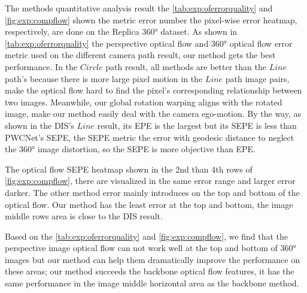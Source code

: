 The methods quantitative analysis result the \cref{tab:exp:oferrorquality} and \cref{fig:exp:compflow} shown the metric error number the pixel-wise error heatmap, respectively, are done on the Replica 360° dataset. 
As shown in \cref{tab:exp:oferrorquality} the perspective optical flow and 360° optical flow error metric used on the different camera path result, our method gets the best performance.
%
In the $Circle$ path result, all methods are better than the $Line$ path's because there is more large pixel motion in the $Line$ path image pairs, make the optical flow hard to find the pixel's corresponding relationship between two images. Meanwhile, our global rotation warping aligns with the rotated image, make our method easily deal with the camera ego-motion.
By the way, as shown in the DIS's $Line$ result, its EPE is the largest but its SEPE is less than PWCNet's SEPE, 
the SEPE metric the error with geodesic distance to neglect the 360° image distortion, so the SEPE is more objective than EPE.

The optical flow SEPE heatmap shown in the 2nd than 4th rows of \cref{fig:exp:compflow}, there are visualized in the same error range and larger error darker.
The other method error mainly introduces on the top and bottom of the optical flow.
Our method has the least error at the top and bottom, the image middle rows area is close to the DIS result. 

Based on the \cref{tab:exp:oferrorquality} and \cref{fig:exp:compflow}, we find that 
%
the perspective image optical flow can not work well at the top and bottom of 360° images but our method can help them dramatically improve the performance on these areas;
%
our method succeeds the backbone optical flow features, it has the same performance in the image middle horizontal area as the backbone method.



